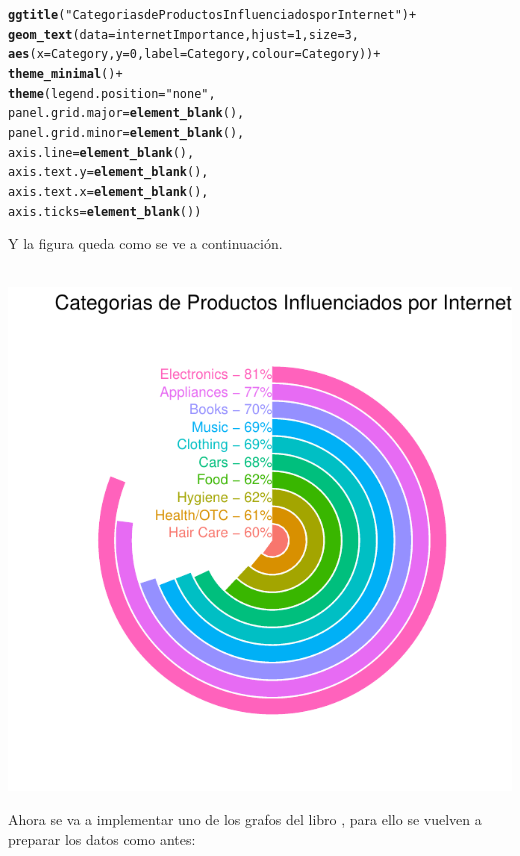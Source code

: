 \documentclass{article}\usepackage[]{graphicx}\usepackage[]{color}
\makeatletter
\def\maxwidth{ %
  \ifdim\Gin@nat@width>\linewidth
    \linewidth
  \else
    \Gin@nat@width
  \fi
}
\newcommand{\hlnum}[1]{\textcolor[rgb]{0.686,0.059,0.569}{#1}}%
\newcommand{\hlstr}[1]{\textcolor[rgb]{0.192,0.494,0.8}{#1}}%
\newcommand{\hlopt}[1]{\textcolor[rgb]{0,0,0}{#1}}%
\newcommand{\hlstd}[1]{\textcolor[rgb]{0.345,0.345,0.345}{#1}}%
\newcommand{\hlkwc}[1]{\textcolor[rgb]{0.333,0.667,0.333}{#1}}%
\newcommand{\hlkwd}[1]{\textcolor[rgb]{0.737,0.353,0.396}{\textbf{#1}}}%
\newenvironment{kframe}{%
 \def\at@end@of@kframe{}%
 \ifinner\ifhmode%
  \def\at@end@of@kframe{\end{minipage}}%
  \begin{minipage}{\columnwidth}%
 \fi\fi%
 \def\FrameCommand##1{\hskip\@totalleftmargin \hskip-\fboxsep
 \colorbox{shadecolor}{##1}\hskip-\fboxsep
     \hskip-\linewidth \hskip-\@totalleftmargin \hskip\columnwidth}%
 \MakeFramed {\advance\hsize-\width
   \@totalleftmargin\z@ \linewidth\hsize
   \@setminipage}}%
 {\par\unskip\endMakeFramed%
 \at@end@of@kframe}
\newenvironment{knitrout}{}{} %
\makeatother
\begin{document}
\begin{knitrout}
\color{fgcolor}\begin{kframe}
\begin{alltt}
  \hlkwd{ggtitle}\hlstd{(}\hlstr{"Categorias de Productos Influenciados por Internet"}\hlstd{)} \hlopt{+}
  \hlkwd{geom_text}\hlstd{(}\hlkwc{data} \hlstd{= internetImportance,} \hlkwc{hjust} \hlstd{=} \hlnum{1}\hlstd{,} \hlkwc{size} \hlstd{=} \hlnum{3}\hlstd{,}
            \hlkwd{aes}\hlstd{(}\hlkwc{x} \hlstd{= Category,} \hlkwc{y} \hlstd{=} \hlnum{0}\hlstd{,} \hlkwc{label} \hlstd{= Category,} \hlkwc{colour} \hlstd{= Category))} \hlopt{+}
  \hlkwd{theme_minimal}\hlstd{()} \hlopt{+}
  \hlkwd{theme}\hlstd{(}\hlkwc{legend.position} \hlstd{=} \hlstr{"none"}\hlstd{,}
        \hlkwc{panel.grid.major} \hlstd{=} \hlkwd{element_blank}\hlstd{(),}
        \hlkwc{panel.grid.minor} \hlstd{=} \hlkwd{element_blank}\hlstd{(),}
        \hlkwc{axis.line} \hlstd{=} \hlkwd{element_blank}\hlstd{(),}
        \hlkwc{axis.text.y} \hlstd{=} \hlkwd{element_blank}\hlstd{(),}
        \hlkwc{axis.text.x} \hlstd{=} \hlkwd{element_blank}\hlstd{(),}
        \hlkwc{axis.ticks} \hlstd{=} \hlkwd{element_blank}\hlstd{())}
\end{alltt}
\end{kframe}
\end{knitrout}
Y la figura queda como se ve a continuaci\'on.~\\~\\
\begin{knitrout}
\color{fgcolor}

{\centering \includegraphics[width=\maxwidth]{figure/plot_ggp_cb-1} 

}



\end{knitrout}
\clearpage
Ahora se va a implementar uno de los grafos del libro%
, para ello se vuelven a preparar los datos como antes:
\end{document}
